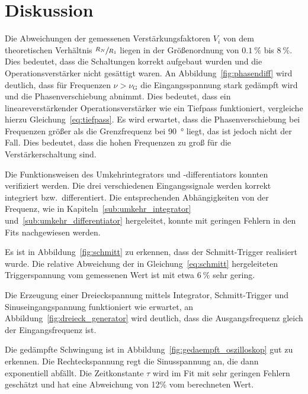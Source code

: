 \section{Diskussion}%
\label{sec:diskussion}


Die Abweichungen der gemessenen Verstärkungsfaktoren $V_i$
von dem theoretischen Verhältnis $\sfrac{R_N}{R_1}$ liegen
in der Größenordnung von $\SI{0.1}{\percent}$ bis $\SI{8}{\percent}$.
Dies bedeutet, dass die Schaltungen korrekt aufgebaut wurden und die Operationsverstärker nicht gesättigt waren.
An Abbildung~\ref{fig:phasendiff} wird deutlich,
dass für Frequenzen $\nu > \nu_\text{G}$
die Eingangsspannung stark gedämpft wird und die Phasenverschiebung abnimmt.
Dies bedeutet, dass ein lineareverstärkender Operationsverstärker wie ein Tiefpass funktioniert, vergleiche hierzu Gleichung~\eqref{eq:tiefpass}.
Es wird erwartet, dass die Phasenverschiebung bei Frequenzen größer als die Grenzfrequenz bei
\SI{90}{\degree} liegt, das ist jedoch nicht der Fall.
Dies bedeutet, dass die hohen Frequenzen zu groß für die Verstärkerschaltung sind.


Die Funktionsweisen des Umkehrintegrators und -differentiators konnten verifiziert werden.
Die drei verschiedenen Eingangssignale werden korrekt integriert bzw.\ differentiert.
Die entsprechenden Abhängigkeiten von der Frequenz, wie in Kapiteln~\ref{sub:umkehr_integrator} und~\ref{sub:umkehr_differentiator} hergeleitet,
konnte mit geringen Fehlern in den Fits nachgewiesen werden.

Es ist in Abbildung~\ref{fig:schmitt} zu erkennen,
dass der Schmitt-Trigger realisiert wurde.
Die relative Abweichung der in Gleichung~\eqref{eq:schmitt}
hergeleiteten Triggerspannung vom gemessenen Wert ist
mit etwa $\SI{6}{\percent}$ sehr gering.

Die Erzeugung einer Dreieckspannung mittels Integrator, Schmitt-Trigger und Sinuseingangspannung funktioniert wie erwartet,
an Abbildung~\ref{fig:dreieck_generator} wird deutlich,
dass die Ausgangsfrequenz gleich der Eingangsfrequenz ist.

Die gedämpfte Schwingung ist in Abbildung~\ref{fig:gedaempft_oszilloskop}
gut zu erkennen.
Die Rechteckspannung regt die Sinusspannung an,
die dann exponentiell abfällt.
Die Zeitkonstante $\tau$ wird im Fit mit sehr geringen Fehlern geschätzt
und hat eine Abweichung von \num{12}\% vom berechneten Wert.
